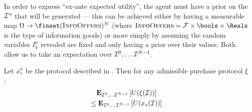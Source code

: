 In order to express ``ex-ante expected utility'', the agent must have a prior on the $\mathcal{I}^n$ that will be generated --- this can be achieved either by having a measurable map $\Samples\to\finset(\InfoOffers)^N$ (where $\InfoOffers=\Sigalg\times\bools\times\Reals$ is the type of information goods) or more simply by assuming the random variables $I^n_k$ revealed are fixed and only having a prior over their values. Both allow us to take an expectation over $\mathcal{I}^0,\dots\mathcal{I}^{N-1}$.

\begin{theorem}
  Let $x^n_*$ be the protocol described in . Then for any admissible purchase protocol $\xi$:
  \begin{multline*}
    \Expectofu[\infooffers^0,\dots\infooffers^{N-1}]{U(\xi(\infooffers))} \\
    \le \Expectofu[\infooffers^0,\dots\infooffers^{N-1}]{U(x_*(\infooffers))}
  \end{multline*}
  \label{thm:exa}
\end{theorem}
